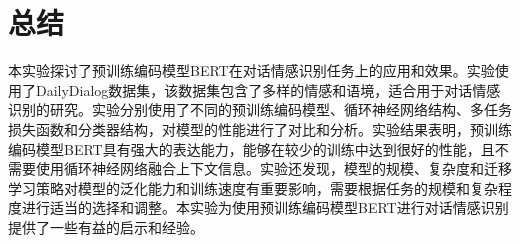 \section{总结}\label{sec:4}

本实验探讨了预训练编码模型BERT在对话情感识别任务上的应用和效果。实验使用了DailyDialog数据集，该数据集包含了多样的情感和语境，适合用于对话情感识别的研究。实验分别使用了不同的预训练编码模型、循环神经网络结构、多任务损失函数和分类器结构，对模型的性能进行了对比和分析。实验结果表明，预训练编码模型BERT具有强大的表达能力，能够在较少的训练中达到很好的性能，且不需要使用循环神经网络融合上下文信息。实验还发现，模型的规模、复杂度和迁移学习策略对模型的泛化能力和训练速度有重要影响，需要根据任务的规模和复杂程度进行适当的选择和调整。本实验为使用预训练编码模型BERT进行对话情感识别提供了一些有益的启示和经验。



